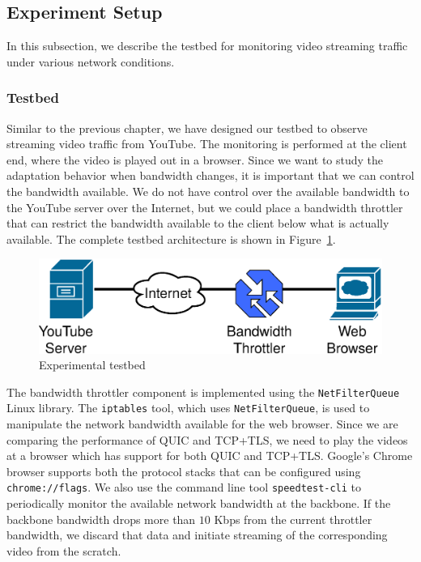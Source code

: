 \subsection{Experiment Setup}
\label{sec:experiments}

In this subsection, we describe the testbed for monitoring video streaming traffic under various network conditions.

\subsubsection{Testbed}
Similar to the previous chapter, we have designed our testbed to observe streaming video traffic from YouTube. 
The monitoring is performed at the client end, where the video is played out in a browser.
Since we want to study the adaptation behavior when bandwidth changes, it is important that we can control the bandwidth available.
We do not have control over the available bandwidth to the YouTube server over the Internet, but we could place a bandwidth throttler that can restrict the bandwidth available to the client below what is actually available.
The complete testbed architecture is shown in Figure~\ref{fig:experimentalSetup}.

\begin{figure}[!t]
	\centering
	\includegraphics[width=0.7\linewidth]{img/experimentalSetup}
	\caption{Experimental testbed}
	\label{fig:experimentalSetup}
\end{figure}

The bandwidth throttler component is implemented using the {\tt NetFilterQueue} Linux library.
The {\tt iptables} tool, which uses {\tt NetFilterQueue}, is used to manipulate the network bandwidth available for the web browser.
Since we are comparing the performance of QUIC and TCP+TLS, we need to play the videos at a browser which has support for both QUIC and TCP+TLS. Google's Chrome browser supports both the protocol stacks that can be configured using {\tt chrome://flags}. We also use the command line tool \texttt{speedtest-cli} to periodically monitor the available network bandwidth at the backbone. If the backbone bandwidth drops more than $10$ Kbps from the current throttler bandwidth, we discard that data and initiate streaming of the corresponding video from the scratch.

